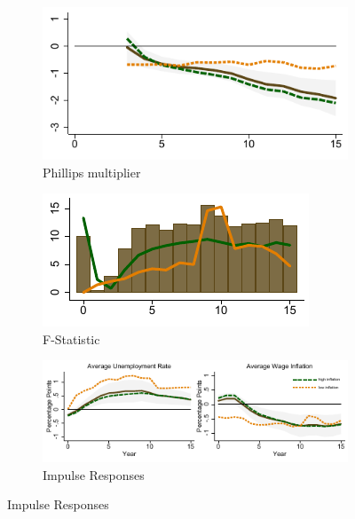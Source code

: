 \documentclass[12pt]{article}
\begin{document}
\begin{appendices}
\begin{figure}[h!]
    \centering
	\caption{State-Dependent Phillips multiplier and IRFs}
	\label{F:Multiplier_SD_App}
	\begin{subfigure}[b]{0.4\textwidth}
		\caption{Phillips multiplier}
		\label{F2:Multiplier_MM}
		\includegraphics[width=\textwidth]{../Output/Figures/fig_full_SDPMBM_LPIV15_2_asym_lowflat.pdf}	
	\end{subfigure}
	\begin{subfigure}[b]{0.4\textwidth}
		\caption{F-Statistic}
		\label{F2:Multiplier_FF}
		\includegraphics[width=\textwidth]{../Output/Figures/fig_full_PMBM_F_LPIV15_2_asym_lowflat.pdf}
	\end{subfigure}
	\begin{subfigure}[b]{0.8\textwidth}
		\caption{Impulse Responses}
		\label{F2:Dynamics_DD}
		\includegraphics[width=\textwidth]{../Output/Figures/fig_full_SDLPIVBM15_2_asym_lowflat.pdf}

\end{subfigure}
\end{figure}
\end{appendices}
\end{document}
